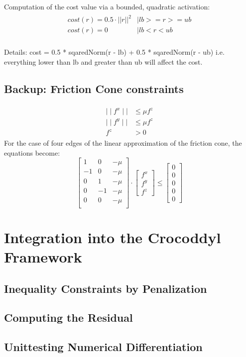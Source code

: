 Computation of the cost value via a bounded, quadratic activation:
\begin{align}
\begin{split}
cost(r) = 0.5 \cdot ||r||^2 &\mid lb >= r >= ub \\
cost(r) = 0 &\mid lb < r < ub \\
\end{split}
\end{align}

Details: 
cost = 0.5 * sqaredNorm(r - lb) + 0.5 * sqaredNorm(r - ub) 
i.e. everything lower than lb and greater than ub will affect the cost. 


\subsection{Backup: Friction Cone constraints}
\begin{align}
\begin{split}
\mid\mid f^x\mid\mid &\leq \mu f^z \\
\mid\mid f^y\mid\mid &\leq \mu f^z \\
f^z &> 0
\end{split}
\end{align}
For the case of four edges of the linear approximation of the friction cone, the equations become:
\begin{equation}
\begin{bmatrix} 1 & 0 & -\mu \\
-1 & 0 & -\mu \\
0 & 1 & -\mu \\
0 & -1 & -\mu \\
0 & 0 & -\mu \\ \end{bmatrix} \cdot
\begin{bmatrix} f^x \\ f^y \\ f^z \end{bmatrix} \leq
\begin{bmatrix} 0 \\ 0 \\ 0 \\ 0 \\ 0 \end{bmatrix}
\end{equation}

\section{Integration into the Crocoddyl Framework}
\subsection{Inequality Constraints by Penalization}
\subsection{Computing the Residual}
\subsection{Unittesting Numerical Differentiation} 




